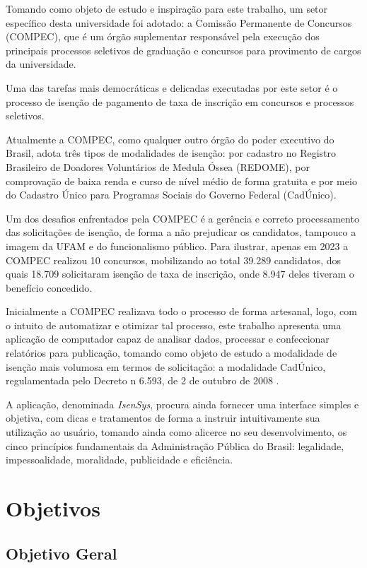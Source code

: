 \documentclass[
	12pt,			%
	openright,		%
	oneside,	
	a4paper,		%
	english,		%
	brazil			%
]{abntex2/abntex2}  %
\begin{document}
		Tomando como objeto de estudo e inspiração para este trabalho, um setor específico desta universidade foi adotado: a Comissão Permanente de Concursos (COMPEC), que é um órgão suplementar responsável pela execução dos principais processos seletivos de graduação e concursos para provimento de cargos da universidade.
		
		Uma das tarefas mais democráticas e delicadas executadas por este setor é o processo de isenção de pagamento de taxa de inscrição em concursos e processos seletivos.
		
		Atualmente a COMPEC, como qualquer outro órgão do poder executivo do Brasil, adota três tipos de modalidades de isenção: por cadastro no Registro Brasileiro de Doadores Voluntários de Medula Óssea (REDOME), por comprovação de baixa renda e curso de nível médio de forma gratuita e por meio do Cadastro Único para Programas Sociais do Governo Federal (CadÚnico).
		
		Um dos desafios enfrentados pela COMPEC é a gerência e correto processamento das solicitações de isenção, de forma a não prejudicar os candidatos, tampouco a imagem da UFAM e do funcionalismo público. Para ilustrar, apenas em 2023 a COMPEC realizou 10 concursos, mobilizando ao total 39.289 candidatos, dos quais 18.709 solicitaram isenção de taxa de inscrição, onde 8.947 deles tiveram o benefício concedido.
		
		Inicialmente a COMPEC realizava todo o processo de forma artesanal, logo, com o intuito de automatizar e otimizar tal processo, este trabalho apresenta uma aplicação de computador capaz de analisar dados, processar e confeccionar relatórios para publicação, tomando como objeto de estudo a modalidade de isenção mais volumosa em termos de solicitação: a modalidade CadÚnico, regulamentada pelo Decreto n{\textordmasculine} 6.593, de 2 de outubro de 2008 \cite{cadunico-decreto}.
		
		A aplicação, denominada \textit{IsenSys}, procura ainda fornecer uma interface simples e objetiva, com dicas e tratamentos de forma a instruir intuitivamente sua utilização ao usuário, tomando ainda como alicerce no seu desenvolvimento, os cinco princípios fundamentais da Administração Pública do Brasil: legalidade, impessoalidade, moralidade, publicidade e eficiência.

		\section{Objetivos}
		
			\subsection{Objetivo Geral}
			
\end{document}
